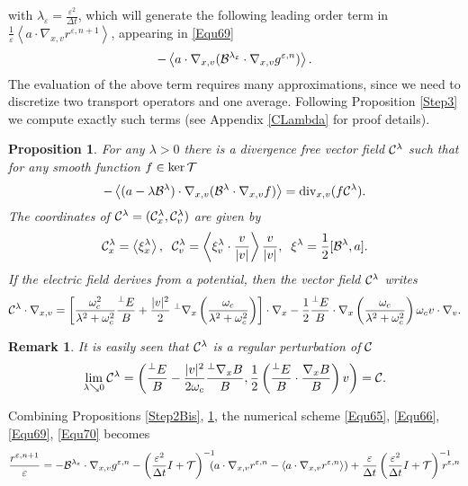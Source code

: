 \documentclass[12pt, a4paper]{article}
\newtheorem{pro}{Proposition}[section]
\newtheorem{remark}{Remark}[section]
\newcounter{Remark}
\newcommand{\xil}[0]{
\xi^\lambda}
\newcommand{\bl}[0]{
{\cal B}^\lambda}
\newcommand{\ble}[0]{
{\cal B}^{\lambda _\varepsilon}}
\newcommand{\cl}[0]{
{\cal C} ^\lambda}
\newcommand{\eps}[0]{
\varepsilon}
\newcommand{\ren}[0]{
r ^{\varepsilon, n}}
\newcommand{\renpo}[0]{
r ^{\varepsilon, n + 1}}
\newcommand{\gen}[0]{
g ^{\varepsilon, n}}
\newcommand{\Divxv}[0]{
\mathrm{div}_{x,v}}
\newcommand{\nxv}[0]{
\nabla_{x,v}}
\newcommand{\ave}[1]{
\left \langle #1 \right \rangle }
\begin{document}
{\[\]
with $\lambda _\eps = \frac{\eps ^2}{\Delta t}$, which will generate the following leading order term in $\frac{1}{\eps} \ave{a \cdot \nxv \renpo}$, appearing in \eqref{Equ69}
\[
- \ave{ a \cdot \nxv ( \ble \cdot \nxv \gen)}.
\]
The evaluation of the above term requires many approximations, since we need to discretize two transport operators and one average. Following Proposition \ref{Step3} we compute exactly such terms (see Appendix \ref{CLambda} for proof details).
\begin{pro}
\label{Step3Bis} For any $\lambda >0$ there is a divergence free vector field $\cl$ such that  for any smooth function $f \in \ker {\cal T}$ 
\[
- \ave{( a - \lambda \bl ) \cdot \nxv ( \bl \cdot \nxv f )} = \Divxv ( f \cl ).
\]
The coordinates of $\cl = (\cl _x, \cl _v)$ are given by
\[
\cl _x = \ave{\xil _x},\;\;\cl _v = \ave{\xil _v \cdot \frac{v}{|v|}} \frac{v}{|v|},\;\;\xil = \frac{1}{2}[\bl, a].
\]
If the electric field derives from a potential, then the vector field $\cl$ writes
\begin{equation}
\label{EquExpressionCLambda}
\cl \cdot \nxv = \left [\frac{\omega _c ^2}{\lambda ^2 + \omega _c ^2} \frac{^\perp E}{B} + \frac{|v|^2}{2} \;{^\perp \nabla _x } \left ( \frac{\omega _c}{\lambda ^2 + \omega _c ^2 } \right ) \right ] \cdot \nabla _x - \frac{1}{2} \frac{^\perp E}{B} \cdot \nabla _x \left ( \frac{\omega _c}{\lambda ^2 + \omega _c ^2 } \right ) \omega _c v \cdot \nabla _v.
\end{equation}
\end{pro}
\begin{remark}
\label{RemStep3Bis} It is easily seen that $\cl $ is a regular perturbation of ${\cal C}$
\[
\lim _{\lambda \searrow 0} \cl = \left ( \frac{^\perp E}{B} - \frac{|v|^2}{2\omega _c} \frac{^\perp \nabla _x B}{B}, \frac{1}{2} \left ( \frac{^\perp E}{B}\cdot \frac{\nabla _x B}{B} \right ) v \right ) = {\cal C}.
\]
\end{remark}
Combining Propositions \ref{Step2Bis}, \ref{Step3Bis}, the numerical scheme \eqref{Equ65}, \eqref{Equ66}, \eqref{Equ69}, \eqref{Equ70} becomes
\begin{equation}
\label{EquSch1} \frac{\renpo}{\eps} = - \ble \cdot \nxv \gen - \left (  \frac{\eps ^2}{\Delta t}I + {\cal T}\right )^{-1} \!\!\!\!( a \cdot \nxv \ren - \ave{a \cdot \nxv \ren } ) + \frac{\eps}{\Delta t} \left (  \frac{\eps ^2}{\Delta t}I + {\cal T}\right )^{-1} \!\!\!\!\!\!\ren
\end{equation}
\begin{equation}
\label{EquSch2}

\end{equation}}
\end{document}
